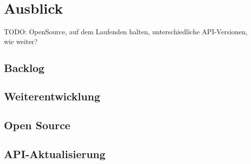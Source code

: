 \section{Ausblick}

TODO: OpenSource, auf dem Laufenden halten, unterschiedliche API-Versionen, wie weiter?

\subsection{Backlog}

\subsection{Weiterentwicklung}

\subsection{Open Source}

\subsection{API-Aktualisierung}
